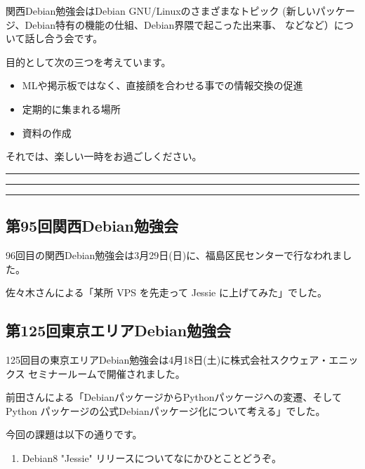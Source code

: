 \documentclass[mingoth,a4paper]{jsarticle}
\begin{document}
 関西Debian勉強会はDebian GNU/Linuxのさまざまなトピック
 (新しいパッケージ、Debian特有の機能の仕組、Debian界隈で起こった出来事、
 などなど）について話し合う会です。

 目的として次の三つを考えています。
 \begin{itemize}
  \item MLや掲示板ではなく、直接顔を合わせる事での情報交換の促進
  \item 定期的に集まれる場所
  \item 資料の作成
 \end{itemize}

 それでは、楽しい一時をお過ごしください。

\newpage

\begin{minipage}[b]{0.2\hsize}
 {}
\end{minipage}
\begin{minipage}[b]{0.8\hsize}
\hrule
\vspace{2mm}
\hrule
\setcounter{tocdepth}{1}
\tableofcontents
\vspace{2mm}
\hrule
\end{minipage}


\subsection{第95回関西Debian勉強会}

96回目の関西Debian勉強会は3月29日(日)に、福島区民センターで行なわれました。

佐々木さんによる「某所 VPS を先走って Jessie に上げてみた」でした。

\subsection{第125回東京エリアDebian勉強会}

125回目の東京エリアDebian勉強会は4月18日(土)に株式会社スクウェア・エニッ
クス セミナールームで開催されました。

前田さんによる「DebianパッケージからPythonパッケージへの変遷、そしてPython
パッケージの公式Debianパッケージ化について考える」でした。


今回の課題は以下の通りです。
\begin{screen}
  \begin{enumerate}
  \item %
    Debian8 "Jessie" リリースについてなにかひとことどうぞ。
  \end{enumerate}
\end{screen}
\end{document}
